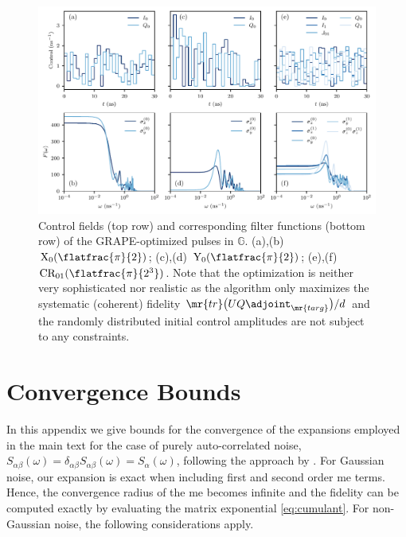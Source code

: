 \begin{figure}
    \centering
    \includegraphics{img/qft_atomic_pulses.pdf}
    \caption{Control fields (top row) and corresponding filter functions (bottom row) of the GRAPE-optimized pulses in $\mathbb{G}$. (a),(b) $\text{X}_0(\flatfrac{\pi}{2})$; (c),(d) $\text{Y}_0(\flatfrac{\pi}{2})$; (e),(f) $\text{CR}_{01}(\flatfrac{\pi}{2^3})$. Note that the optimization is neither very sophisticated nor realistic as the algorithm only maximizes the systematic (coherent) fidelity $\mr{tr}\bigl(UQ\adjoint_\mr{targ}\bigr)/d$ and the randomly distributed initial control amplitudes are not subject to any constraints.}
    \label{appfig:qft:gates}
\end{figure}

\section{Convergence Bounds}\label{appsec:convergence}
In this appendix we give bounds for the convergence of the expansions employed in the main text for the case of purely auto-correlated noise, $S_{\alpha\beta}(\omega) = \delta_{\alpha\beta}S_{\alpha\beta}(\omega) =  S_\alpha(\omega)$, following the approach by \citeauthor{Green2013}. For Gaussian noise, our expansion is exact when including first and second order \acrfull{me} terms. Hence, the convergence radius of the \gls{me} becomes infinite and the fidelity can be computed exactly by evaluating the matrix exponential \cref{eq:cumulant}. For non-Gaussian noise, the following considerations apply.

